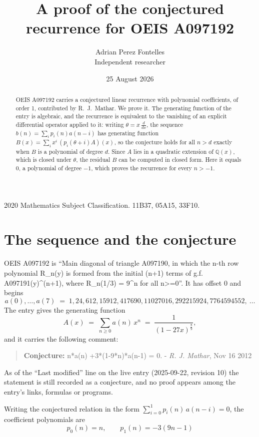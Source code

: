 \documentclass[11pt,a4paper]{article}
\title{A proof of the conjectured recurrence for OEIS A097192}
\author{Adrian Perez Fontelles\\ \small Independent researcher}
\date{25 August 2026}
\theoremstyle{plain}
\theoremstyle{definition}
\begin{document}
\maketitle

\begin{abstract}
OEIS A097192 carries a conjectured linear recurrence with polynomial coefficients, of
order 1, contributed by R.~J.~Mathar. We prove it. The generating function of the
entry is algebraic, and the recurrence is equivalent to the vanishing of an explicit
differential operator applied to it: writing $\theta=x\,\frac{d}{dx}$, the sequence
$b(n)=\sum_{i}p_{i}(n)a(n-i)$ has generating function
$B(x)=\sum_{i}x^{i}\,(p_{i}(\theta+i)A)(x)$, so the conjecture holds for all $n>d$ exactly
when $B$ is a polynomial of degree $d$. Since $A$ lies in a quadratic extension of
$\mathbb{Q}(x)$, which is closed under $\theta$, the residual $B$ can be computed in
closed form. Here it equals $0$, a polynomial of degree $-1$, which proves
the recurrence for every $n>-1$.
\end{abstract}

\noindent\small 2020 Mathematics Subject Classification. 11B37, 05A15, 33F10.\normalsize

\section{The sequence and the conjecture}

OEIS A097192 is ``Main diagonal of triangle A097190, in which the n-th row polynomial R\_n(y) is formed from the initial (n+1) terms of g.f. A097191(y)\^{}(n+1), where R\_n(1/3) = 9\^{}n for all n>=0''. It has offset $0$ and begins
\[
a(0),\dots,a(7)\;=\;1, 24, 612, 15912, 417690, 11027016, 292215924, 7764594552,\ \dots
\]
The entry gives the generating function
\begin{equation}\label{eq:gf}
A(x)\;=\;\sum_{n\ge 0} a(n)\,x^{n}\;=\;\frac{1}{\left(1 - 27 x\right)^{\frac{8}{9}}} ,
\end{equation}
and it carries the following comment:
\begin{quote}\small
\textbf{Conjecture:} n*a(n) +3*(1-9*n)*a(n-1) = 0. - \emph{R. J. Mathar}, Nov 16 2012
\end{quote}
As of the ``Last modified'' line on the live entry (2025-09-22, revision 10) the
statement is still recorded as a conjecture, and no proof appears among the entry's links,
formulas or programs.

Writing the conjectured relation in the form $\sum_{i=0}^{1}p_{i}(n)\,a(n-i)=0$,
the coefficient polynomials are
\[
p_{0}(n)=n,\qquad p_{1}(n)=- 3 \left(9 n - 1\right)
\]
\end{document}
